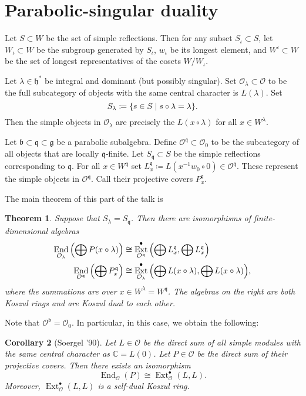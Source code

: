 \documentclass[leqno, openany]{memoir}
\newtheorem{thm}{Theorem}[section]
\newtheorem{cor}[thm]{Corollary}
\theoremstyle{definition}
\theoremstyle{remark}
\theoremstyle{plain}
\theoremstyle{definition}
\theoremstyle{remark}
\newcommand{\C}{\mathbb{C}}
\newcommand{\cO}{\mathcal{O}}
\newcommand{\g}{\mathfrak{g}}
\newcommand{\h}{\mathfrak{h}}
\renewcommand{\b}{\mathfrak{b}}
\newcommand{\mf}[1]{\mathfrak{#1}}
\DeclareMathOperator{\End}{End}
\DeclareMathOperator{\Ext}{Ext}
\begin{document}
\section{Parabolic-singular duality}%
\label{sec:parabolic_singular_duality}

Let $S \subset W$ be the set of simple reflections. Then for any subset $S_{\iota} \subset S$, let $W_{\iota} \subset W$ be the subgroup generated by $S_{\iota}$, $w_{\iota}$ be its longest element, and $W^{\iota} \subset W$ be the set of longest representatives of the cosets $W / W_{\iota}$.

Let $\lambda \in \h^*$ be integral and dominant (but possibly singular). Set $\cO_{\lambda} \subset \cO$ to be the full subcategory of objects with the same central character is $L(\lambda)$. Set
\[ S_{\lambda} \coloneqq \qty{s \in S \mid s \circ \lambda = \lambda}. \]
Then the simple objects in $\cO_{\lambda}$ are precisely the $L(x \circ \lambda)$ for all $x \in W^{\lambda}$.

Let $\b \subset \mf{q} \subset \g$ be a parabolic subalgebra. Define $\cO^{\mf{q}} \subset \cO_0$ to be the subcategory of all objects that are locally $\mf{q}$-finite. Let $S_{\mf{q}} \subset S$ be the simple reflections corresponding to $\mf{q}$. For all $x \in W^{\mf{q}}$ set $L_x^{\mf{q}} \coloneqq L(x^{-1} w_0 \circ 0) \in \cO^{\mf{q}}$. These represent the simple objects in $\cO^{\mf{q}}$. Call their projective covers $P_x^{\mf{q}}$.

The main theorem of this part of the talk is
\begin{thm}
    Suppose that $S_{\lambda} = S_{\mf{q}}$. Then there are isomorphisms of finite-dimensional algebras
    \begin{align*}
        \End_{\cO_{\lambda}} \qty(\bigoplus P(x \circ \lambda)) &\cong \Ext_{\cO^{\mf{q}}}^{\bullet}\qty(\bigoplus L_x^{\mf{q}}, \bigoplus L_x^{\mf{q}}) \\
        \End_{\cO^{\mf{q}}} \qty(\bigoplus P_x^{\mf{q}}) & \cong \Ext_{\cO_{\lambda}}^{\bullet} \qty(\bigoplus L(x \circ \lambda), \bigoplus L(x \circ \lambda)),
    \end{align*}
    where the summations are over $x \in W^{\lambda} = W^{\mf{q}}$. The algebras on the right are both Koszul rings and are Koszul dual to each other.
\end{thm}

Note that $\cO^{\b} = \cO_0$. In particular, in this case, we obtain the following:
\begin{cor}[Soergel '90]
    Let $L \in \cO$ be the direct sum of all simple modules with the same central character as $\C = L(0)$. Let $P \in \cO$ be the direct sum of their projective covers. Then there exists an isomorphism
    \[ \End_{\cO}(P) \cong \Ext_{\cO}^{\bullet}(L, L). \]
    Moreover, $\Ext_{\cO}^{\bullet}(L, L)$ is a self-dual Koszul ring.
\end{cor}
\end{document}

